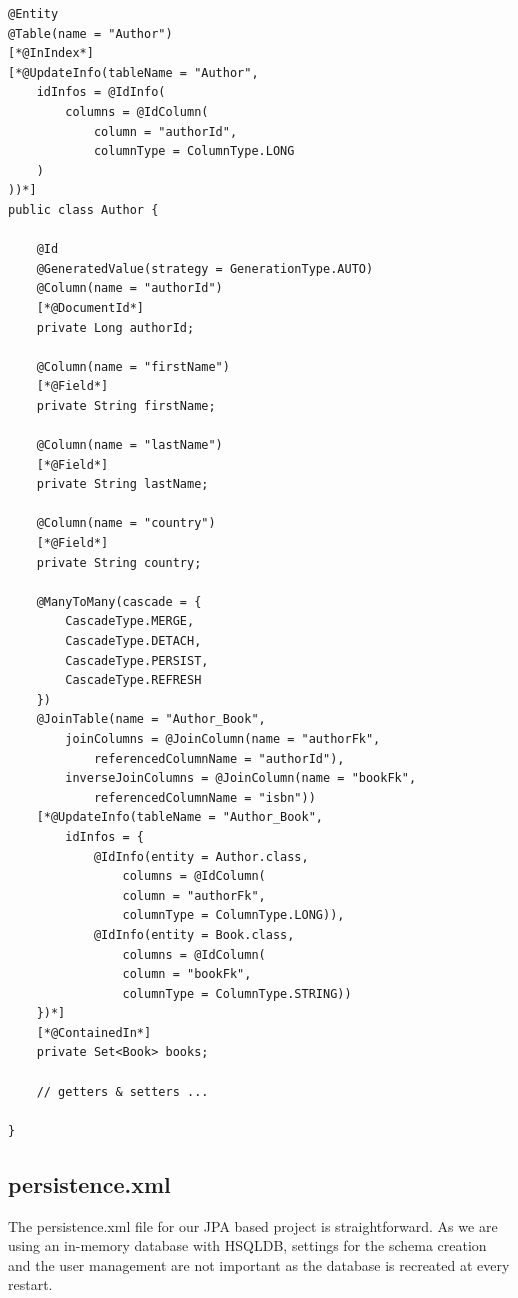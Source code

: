 \lstset{language=java}
\begin{lstlisting}[frame=htrbl, caption={Author.java complete}, label={lst:author.java_complete}]
@Entity
@Table(name = "Author")
[*@InIndex*]
[*@UpdateInfo(tableName = "Author", 
	idInfos = @IdInfo(
		columns = @IdColumn(
			column = "authorId",
			columnType = ColumnType.LONG
	)
))*]
public class Author {
	
	@Id
	@GeneratedValue(strategy = GenerationType.AUTO)
	@Column(name = "authorId")
	[*@DocumentId*]
	private Long authorId;
	
	@Column(name = "firstName")
	[*@Field*]
	private String firstName;
	
	@Column(name = "lastName")
	[*@Field*]
	private String lastName;
	
	@Column(name = "country")
	[*@Field*]
	private String country;
	
	@ManyToMany(cascade = {
		CascadeType.MERGE,
		CascadeType.DETACH,
		CascadeType.PERSIST,
		CascadeType.REFRESH
	})
	@JoinTable(name = "Author_Book", 
		joinColumns = @JoinColumn(name = "authorFk", 
			referencedColumnName = "authorId"),
		inverseJoinColumns = @JoinColumn(name = "bookFk",
			referencedColumnName = "isbn"))
	[*@UpdateInfo(tableName = "Author_Book",
		idInfos = {
			@IdInfo(entity = Author.class,
				columns = @IdColumn(
				column = "authorFk",
				columnType = ColumnType.LONG)),
			@IdInfo(entity = Book.class,
				columns = @IdColumn(
				column = "bookFk",
				columnType = ColumnType.STRING))
	})*]
	[*@ContainedIn*]
	private Set<Book> books;
	
	// getters & setters ...
	
}
\end{lstlisting}


\pagebreak

\subsection{persistence.xml}

The persistence.xml file for our JPA based project is straightforward. As we are using an in-memory database with HSQLDB, settings for the schema creation and the user management are not important as the database is recreated at every restart.
\\

